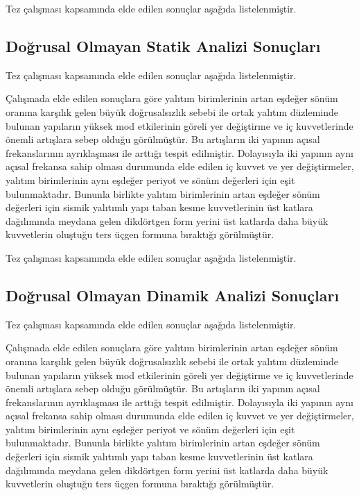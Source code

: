 Tez çalışması kapsamında elde edilen sonuçlar aşağıda listelenmiştir. 

\subsection{Doğrusal Olmayan Statik Analizi Sonuçları}

Tez çalışması kapsamında elde edilen sonuçlar aşağıda listelenmiştir. 

Çalışmada elde edilen sonuçlara göre yalıtım birimlerinin artan eşdeğer
sönüm oranına karşılık gelen büyük doğrusalsızlık sebebi ile ortak
yalıtım düzleminde bulunan yapıların yüksek mod etkilerinin göreli
yer değiştirme ve iç kuvvetlerinde önemli artışlara sebep olduğu görülmüştür.
Bu artışların iki yapının açısal frekanslarının ayrıklaşması ile arttığı
tespit edilmiştir. Dolayısıyla iki yapının aynı açısal frekansa sahip
olması durumunda elde edilen iç kuvvet ve yer değiştirmeler, yalıtım
birimlerinin aynı eşdeğer periyot ve sönüm değerleri için eşit bulunmaktadır.
Bununla birlikte yalıtım birimlerinin artan eşdeğer sönüm değerleri
için sismik yalıtımlı yapı taban kesme kuvvetlerinin üst katlara dağılımında
meydana gelen dikdörtgen form yerini üst katlarda daha büyük kuvvetlerin
oluştuğu ters üçgen formuna bıraktığı görülmüştür.

Tez çalışması kapsamında elde edilen sonuçlar aşağıda listelenmiştir. 

\subsection{Doğrusal Olmayan Dinamik Analizi Sonuçları}

Tez çalışması kapsamında elde edilen sonuçlar aşağıda listelenmiştir. 

Çalışmada elde edilen sonuçlara göre yalıtım birimlerinin artan eşdeğer
sönüm oranına karşılık gelen büyük doğrusalsızlık sebebi ile ortak
yalıtım düzleminde bulunan yapıların yüksek mod etkilerinin göreli
yer değiştirme ve iç kuvvetlerinde önemli artışlara sebep olduğu görülmüştür.
Bu artışların iki yapının açısal frekanslarının ayrıklaşması ile arttığı
tespit edilmiştir. Dolayısıyla iki yapının aynı açısal frekansa sahip
olması durumunda elde edilen iç kuvvet ve yer değiştirmeler, yalıtım
birimlerinin aynı eşdeğer periyot ve sönüm değerleri için eşit bulunmaktadır.
Bununla birlikte yalıtım birimlerinin artan eşdeğer sönüm değerleri
için sismik yalıtımlı yapı taban kesme kuvvetlerinin üst katlara dağılımında
meydana gelen dikdörtgen form yerini üst katlarda daha büyük kuvvetlerin
oluştuğu ters üçgen formuna bıraktığı görülmüştür.

